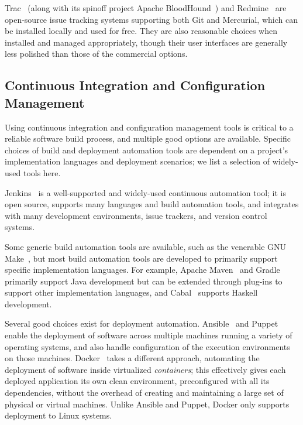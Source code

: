 Trac~\cite{Trac} (along with its spinoff project Apache
BloodHound~\cite{ApacheBloodhound}) and Redmine~\cite{Redmine} are
open-source issue tracking systems supporting both Git and Mercurial,
which can be installed locally and used for free. They are also
reasonable choices when installed and managed appropriately, though
their user interfaces are generally less polished than those of the
commercial options.


\subsection{Continuous Integration and Configuration Management}

Using continuous integration and configuration management tools is
critical to a reliable software build process, and multiple good
options are available. Specific choices of build and deployment
automation tools are dependent on a project's implementation languages
and deployment scenarios; we list a selection of widely-used tools
here.

Jenkins~\cite{Jenkins} is a well-supported and
widely-used continuous automation tool; it is open source, supports
many languages and build automation tools, and integrates with many
development environments, issue trackers, and version control
systems. 

Some generic build automation tools are available, such as the
venerable GNU Make~\cite{GNUMake}, but most build automation tools
are developed to primarily support specific implementation
languages. For example, Apache Maven~\cite{ApacheMaven} and
Gradle~\cite{Gradle} primarily support Java development but can be
extended through plug-ins to support other implementation languages,
and Cabal~\cite{Cabal} supports Haskell development.

Several good choices exist for deployment
automation. Ansible~\cite{Ansible} and Puppet~\cite{Puppet} enable the
deployment of software across multiple machines running a variety of
operating systems, and also handle configuration of the execution
environments on those machines. Docker~\cite{Docker} takes a different
approach, automating the deployment of software inside virtualized
\emph{containers}; this effectively gives each deployed application
its own clean environment, preconfigured with all its dependencies,
without the overhead of creating and maintaining a large set of
physical or virtual machines. Unlike Ansible and Puppet, Docker only
supports deployment to Linux systems. 

